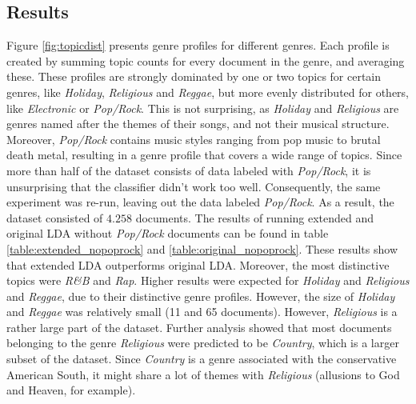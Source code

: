 \subsection{Results}
Figure \ref{fig:topicdist} presents genre profiles for different genres. Each profile is created by summing topic counts for every document in the genre, and averaging these. These profiles are strongly dominated by one or two topics for certain genres, like \textit{Holiday}, \textit{Religious} and \textit{Reggae}, but more evenly distributed for others, like \textit{Electronic} or \textit{Pop/Rock}. This is not surprising, as \textit{Holiday} and \textit{Religious} are genres named after the themes of their songs, and not their musical structure. Moreover, \textit{Pop/Rock} contains music styles ranging from pop music to brutal death metal, resulting in a genre profile that covers a wide range of topics. Since more than half of the dataset consists of data labeled with \textit{Pop/Rock}, it is unsurprising that the classifier didn't work too well. 
Consequently, the same experiment was re-run, leaving out the data labeled \textit{Pop/Rock}. As a result, the dataset consisted of $4.258$ documents. The results of running extended and original LDA without \textit{Pop/Rock} documents can be found in table \ref{table:extended_nopoprock} and \ref{table:original_nopoprock}. These results show that extended LDA outperforms original LDA. Moreover, the most distinctive topics were \textit{R\&B} and \textit{Rap}. Higher results were expected for \textit{Holiday} and \textit{Religious} and \textit{Reggae}, due to their distinctive genre profiles. However, the size of \textit{Holiday} and \textit{Reggae} was relatively small (11 and 65 documents). However, \textit{Religious} is a rather large part of the dataset. Further analysis showed that most documents belonging to the genre \textit{Religious} were predicted to be \textit{Country}, which is a larger subset of the dataset. Since \textit{Country} is a genre associated with the conservative American South, it might share a lot of themes with \textit{Religious} (allusions to God and Heaven, for example).







